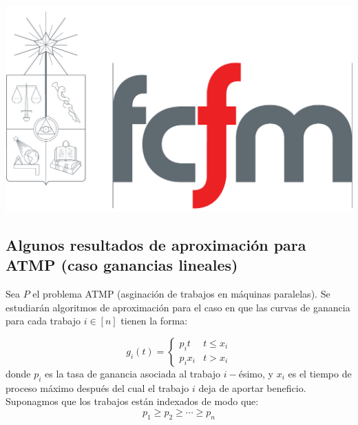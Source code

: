 \documentclass[10pt]{article}
\theoremstyle{plain}
\theoremstyle{definition}
\newcommand{\sca}{Escriba Uno}
\newcommand{\scb}{Escriba Dos}
\newcommand{\scc}{Escriba Tres}
\newcommand{\fecha}{5 de noviembre 2018 }
\begin{document}
\vspace*{-1.2 cm}
\begin{flushleft}
\includegraphics[scale=0.15]{fcfm}
\end{flushleft}
\bigskip


\subsection{Algunos resultados de aproximación para ATMP (caso ganancias lineales)}

Sea $P$ el problema ATMP (asginaci\'on de trabajos en m\'aquinas paralelas). Se estudiar\'an algoritmos de aproximaci\'on para el caso en que las curvas de ganancia para cada trabajo $i \in [n]$ tienen la forma:


$$
g_i(t) = \left\{\begin{array}{lr}
p_i t & t \leq x_i \\
p_i x_i & t>x_i
\end{array}\right.
$$
donde $p_i$ es la tasa de ganancia asociada al trabajo $i-$\'esimo, y $x_i$ es el tiempo de proceso m\'aximo despu\'es del cual el trabajo $i$ deja de aportar beneficio. Suponagmos que los trabajos est\'an indexados de modo que:
\begin{equation}
\label{eq:trabajosOrd}
p_1 \geq p_2 \geq \cdots \geq p_n
\end{equation}
\end{document}
